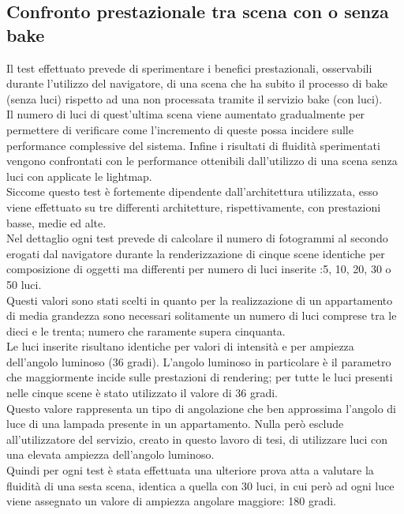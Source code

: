 \subsection{Confronto prestazionale tra scena con o senza bake}
\label{sec:chapter_prove_sperimentali_navigator_confronto_prestazionale}
Il test effettuato prevede di sperimentare i benefici prestazionali, osservabili durante l’utilizzo del navigatore, di una scena che ha subito il processo di bake (senza luci) rispetto ad una non processata tramite il servizio bake (con luci).
\\
Il numero di luci di quest’ultima scena viene aumentato gradualmente per permettere di verificare come l’incremento di queste possa incidere sulle performance complessive del sistema. 
Infine i risultati di fluidità sperimentati vengono confrontati con le performance ottenibili dall’utilizzo di una scena senza luci con applicate le lightmap.
\\
Siccome questo test è fortemente dipendente dall’architettura utilizzata, esso viene effettuato su tre differenti architetture, rispettivamente, con prestazioni basse, medie ed alte.
\\
Nel dettaglio ogni test prevede di calcolare il numero di fotogrammi al secondo erogati dal navigatore durante la renderizzazione di cinque scene identiche per composizione di oggetti ma differenti per numero di luci inserite :5, 10, 20, 30 o 50 luci.
\\
Questi valori sono stati scelti in quanto per la realizzazione di un appartamento di media grandezza sono necessari solitamente un numero di luci comprese tra le dieci e le trenta; numero che raramente supera cinquanta.
\\
Le luci inserite risultano identiche per valori di intensità e per ampiezza dell’angolo luminoso (36 gradi). 
L’angolo luminoso in particolare è il parametro che maggiormente incide sulle prestazioni di rendering; per tutte le luci presenti nelle cinque scene è stato utilizzato il valore di 36 gradi.
\\
Questo valore rappresenta un tipo di angolazione che ben approssima l’angolo di luce di una lampada presente in un appartamento.
Nulla però esclude all’utilizzatore del servizio, creato in questo lavoro di tesi, di utilizzare luci con una elevata ampiezza dell’angolo luminoso.
\\ 
Quindi per ogni test è stata effettuata una ulteriore prova atta a valutare la fluidità di una sesta scena, identica a quella con 30 luci, in cui però ad ogni luce viene assegnato un valore di ampiezza angolare maggiore: 180 gradi.
